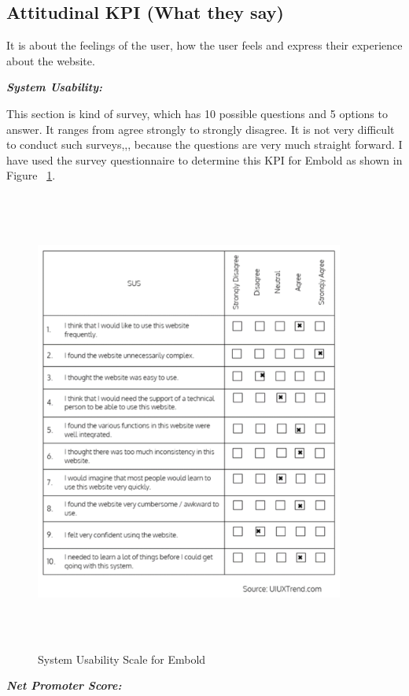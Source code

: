 \subsection{ Attitudinal KPI (What they say)}
It is about the feelings of the user, how the user feels and express their experience about the website. \par
\textbf{\emph{System Usability:}}\par
This section is kind of survey, which has 10 possible questions and 5 options to answer. It ranges from agree strongly to strongly disagree. It is not very difficult to conduct such surveys,,, because the questions are very much straight forward. I have used the survey questionnaire to determine this KPI for Embold as shown in Figure ~\ref{fig:SUS}.\par
\begin{figure}[htbp]
\begin{center}
\includegraphics[width=4in, height=6in]{image.png}
\caption{System Usability Scale for Embold}
\label{fig:SUS}
\end{center}
\end{figure}
\textbf{\emph{Net Promoter Score:}}\par
